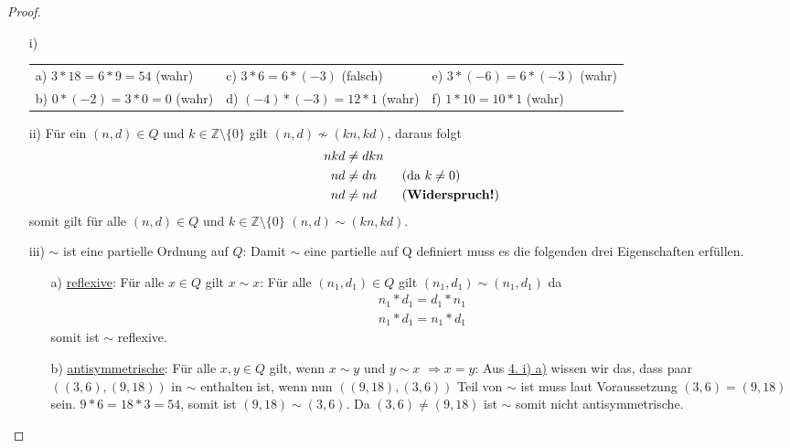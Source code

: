 \documentclass{exam}
\begin{document}
\begin{proof} \ \newline
	\begin{enumerate}
		\item [i)]
		      \renewcommand{\arraystretch}{1.5}
		      \begin{tabularx}{\textwidth}{ X X X }
			      a) $3*18 = 6*9 = 54$ (wahr)  & c) $3*6 = 6*(-3)$ (falsch)  & e) $3*(-6) = 6 * (-3)$ (wahr) \\
			      b) $0*(-2) = 3*0 = 0$ (wahr) & d) $(-4)*(-3)= 12*1$ (wahr) & f) $1*10 = 10*1$ (wahr)
		      \end{tabularx}
		\item [ii)] Für ein $(n,d) \in Q$ und $k \in \mathbb{Z}\setminus\{0\}$ gilt $(n,d) \not\sim (kn,kd)$, daraus folgt
		      \begin{align}
			      nkd & \neq dkn                            \\
			      nd  & \neq dn \tag{da $k \neq 0$}         \\
			      nd  & \neq nd \tag{\textbf{Widerspruch!}}
		      \end{align}
		      somit gilt für alle $(n,d) \in Q$ und $k \in \mathbb{Z}\setminus\{0\}$ $(n,d) \sim (kn,kd)$.
		\item [iii)] $\sim$ ist eine partielle Ordnung auf $Q$: \newline
		      Damit $\sim$ eine partielle auf Q definiert muss es die folgenden drei Eigenschaften erfüllen.
		      \begin{enumerate}
			      \item [a)] \underline{reflexive}: Für alle $x \in Q$ gilt $x \sim x$: \newline
			            Für alle $(n_1,d_1) \in Q$ gilt $(n_1, d_1) \sim (n_1, d_1)$ da \begin{align}
				            n_1*d_1 = d_1*n_1 \\
				            n_1*d_1 = n_1*d_1
			            \end{align} somit ist $\sim$ reflexive. \checkmark
			      \item [b)] \underline{antisymmetrische}: Für alle $x, y \in Q$ gilt, wenn $x \sim y$ und $y \sim x$ $\Rightarrow x = y$: \newline
			            Aus \underline{4. i) a)} wissen wir das, dass paar $((3,6),(9,18))$ in $\sim$ enthalten ist, wenn nun $((9,18),(3,6))$ Teil von $\sim$ ist muss laut Voraussetzung $(3,6) = (9,18)$ sein.
			            $9*6 = 18 * 3 = 54$, somit ist $(9,18) \sim (3,6)$.
			            Da $(3,6) \neq (9,18)$ ist $\sim$ somit nicht antisymmetrische.

\end{enumerate}
\end{enumerate}
\end{proof}
\end{document}
